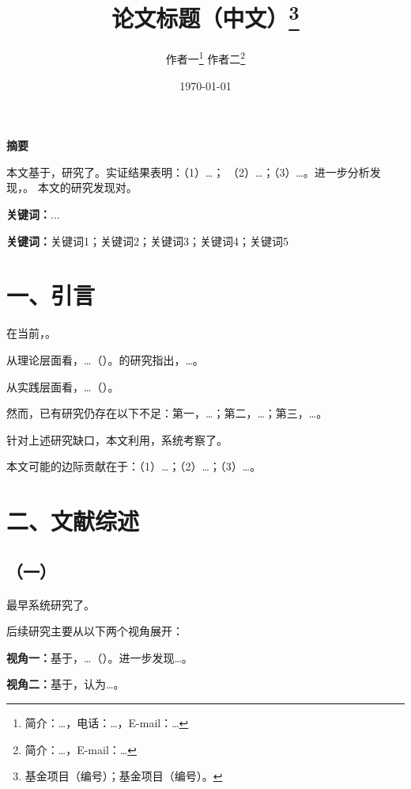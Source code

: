 \documentclass[lang=cn, aaffiliation={中国}]{ctexart}
\title{论文标题（中文）\thanks{基金项目（编号）；基金项目（编号）。}}
\author{作者一\thanks{简介：\dots，电话：\dots，E-mail：\dots}
       \quad 作者二\thanks{简介：\dots，E-mail：\dots}}
\date{\today}
\newenvironment{cnabstract}{%
    \par\textbf{摘\quad 要}
    \indent
}{\par\vspace{0.5\baselineskip}\par\textbf{关键词：}...}
\begin{document}
\thispagestyle{empty}
\maketitle
\thispagestyle{fancy}

\begin{cnabstract}
    本文基于，研究了。实证结果表明：（1）\dots；
    （2）\dots；（3）\dots。进一步分析发现，。
    本文的研究发现对。
\end{cnabstract}

\textbf{关键词：}关键词1；关键词2；关键词3；关键词4；关键词5

\section{一、引言}
\label{sec:intro}

\indent 在当前，。

从理论层面看，\dots（\citealp{xxx}）。\citet{yyy}的研究指出，\dots。

从实践层面看，\dots（\citealp{zzz}）。

然而，已有研究仍存在以下不足：第一，\dots；第二，\dots；第三，\dots。

针对上述研究缺口，本文利用，系统考察了。

本文可能的边际贡献在于：（1）\dots；（2）\dots；（3）\dots。

\section{二、文献综述}
\label{sec:lit}

\subsection{（一）}
\label{sec:lit:topic1}

\citet{xxx}最早系统研究了。

后续研究主要从以下两个视角展开：

\textbf{视角一：}基于，\dots（\citealp{yyy}）。\citet{zzz}进一步发现\dots。

\textbf{视角二：}基于，\citealp{www}认为\dots。
\end{document}
